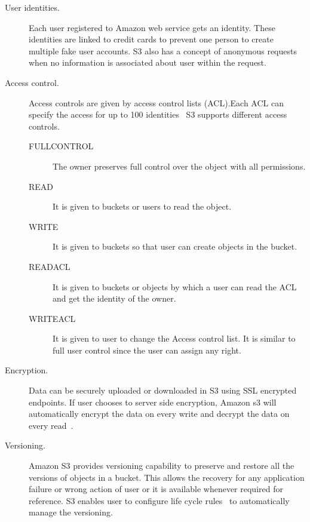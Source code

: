 \begin{description}

\item [User identities.] Each user registered to Amazon web service
  gets an identity. These identities are linked to credit cards to
  prevent one person to create multiple fake user accounts. S3 also
  has a concept of anonymous requests when no information is
  associated about user within the request.

\item [Access control.] Access controls are given by access control
  lists (ACL).Each ACL can specify the access for up to 100
  identities~\cite{hid-sp18-420-amazon-S3-details} S3 supports
  different access controls.

\begin{description}
\item [FULLCONTROL] The owner preserves full control over the object
  with all permissions.
\item [READ] It is given to buckets or users to read the object.
\item [WRITE] It is given to buckets so that user can create objects
  in the bucket.
\item [READACL] It is given to buckets or objects by which a user can
  read the ACL and get the identity of the owner.
\item [WRITEACL] It is given to user to change the Access control
  list. It is similar to full user control since the user can assign
  any right.
\end{description}

\item [Encryption.] Data can be securely uploaded or downloaded in S3
  using SSL encrypted endpoints. If user chooses to server side
  encryption, Amazon s3 will automatically encrypt the data on every
  write and decrypt the data on every
  read~\cite{hid-sp18-420-amazon-S3-data-encryption}.

\item [Versioning.] Amazon S3 provides versioning capability to
  preserve and restore all the versions of objects in a bucket. This
  allows the recovery for any application failure or wrong action of
  user or it is available whenever required for reference. S3 enables
  user to configure life cycle
  rules~\cite{hid-sp18-420-amazon-S3-lidecycle-rule} to automatically
  manage the versioning.

\end{description}



